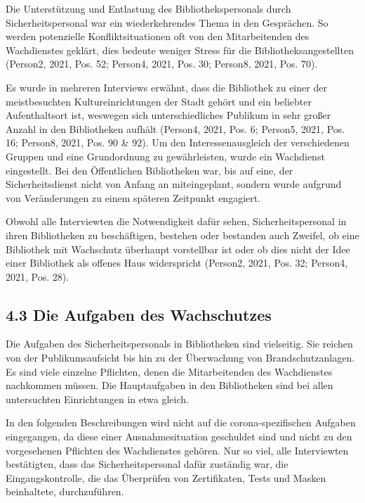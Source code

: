 \documentclass[a4paper,
fontsize=11pt,
oneside,
numbers=noperiodatend,
parskip=half-,
bibliography=totoc,
final
]{scrartcl}
\begin{document}
Die Unterstützung und Entlastung des Bibliothekspersonals durch
Sicherheitspersonal war ein wiederkehrendes Thema in den Gesprächen. So
werden potenzielle Konfliktsituationen oft von den Mitarbeitenden des
Wachdienstes geklärt, dies bedeute weniger Stress für die
Bibliotheksangestellten (Person2, 2021, Pos. 52; Person4, 2021, Pos. 30;
Person8, 2021, Pos. 70).

Es wurde in mehreren Interviews erwähnt, dass die Bibliothek zu einer
der meistbesuchten Kultureinrichtungen der Stadt gehört und ein
beliebter Aufenthaltsort ist, weswegen sich unterschiedliches Publikum
in sehr großer Anzahl in den Bibliotheken aufhält (Person4, 2021, Pos.
6; Person5, 2021, Pos. 16; Person8, 2021, Pos. 90 \& 92). Um den
Interessenausgleich der verschiedenen Gruppen und eine Grundordnung zu
gewährleisten, wurde ein Wachdienst eingestellt. Bei den Öffentlichen
Bibliotheken war, bis auf eine, der Sicherheitsdienst nicht von Anfang
an miteingeplant, sondern wurde aufgrund von Veränderungen zu einem
späteren Zeitpunkt engagiert.

Obwohl alle Interviewten die Notwendigkeit dafür sehen,
Sicherheitspersonal in ihren Bibliotheken zu beschäftigen, bestehen oder
bestanden auch Zweifel, ob eine Bibliothek mit Wachschutz überhaupt
vorstellbar ist oder ob dies nicht der Idee einer Bibliothek als offenes
Haus widerspricht (Person2, 2021, Pos. 32; Person4, 2021, Pos. 28).

\hypertarget{die-aufgaben-des-wachschutzes}{%
\subsection{4.3 Die Aufgaben des
Wachschutzes}\label{die-aufgaben-des-wachschutzes}}

Die Aufgaben des Sicherheitspersonals in Bibliotheken sind vielseitig.
Sie reichen von der Publikumsaufsicht bis hin zu der Überwachung von
Brandschutzanlagen. Es sind viele einzelne Pflichten, denen die
Mitarbeitenden des Wachdienstes nachkommen müssen. Die Hauptaufgaben in
den Bibliotheken sind bei allen untersuchten Einrichtungen in etwa
gleich.

In den folgenden Beschreibungen wird nicht auf die corona-spezifischen
Aufgaben eingegangen, da diese einer Ausnahmesituation geschuldet sind
und nicht zu den vorgesehenen Pflichten des Wachdienstes gehören. Nur so
viel, alle Interviewten bestätigten, dass das Sicherheitspersonal dafür
zuständig war, die Eingangskontrolle, die das Überprüfen von
Zertifikaten, Tests und Masken beinhaltete, durchzuführen.
\end{document}
